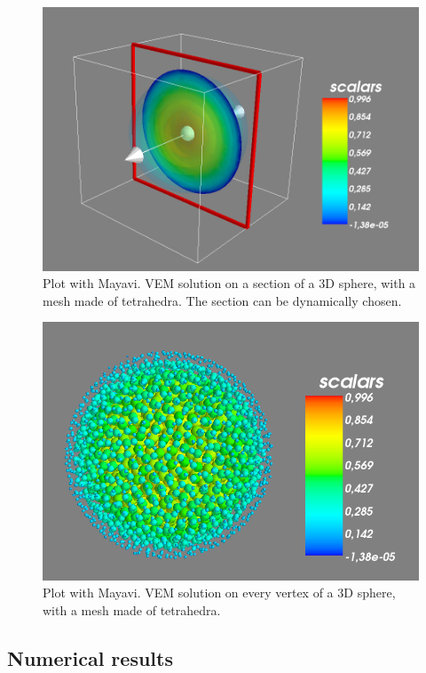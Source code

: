 \begin{figure}[!h]
\centering
\includegraphics[scale=0.35]{images/mayavi3D.png}
\caption{Plot with Mayavi. VEM solution on a section of a $3$D sphere, with a mesh made of tetrahedra. The section can be dynamically chosen.}
\label{img:mayaviCoupe}
\end{figure}

\begin{figure}[!h]
\centering
\includegraphics[scale=0.35]{images/mayavi3DPoints.png}
\caption{Plot with Mayavi. VEM solution on every vertex of a $3$D sphere, with a mesh made of tetrahedra.}
\label{img:mayavi3D}
\end{figure}

\subsection{Numerical results}

